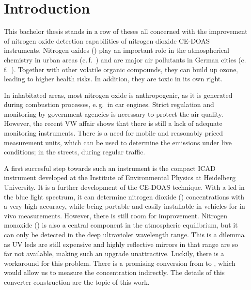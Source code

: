 \section{Introduction}
\label{sec:intro}

This bachelor thesis stands in a row of theses all concerned with the
improvement of nitrogen oxide detection capabilities of nitrogen
dioxide CE-DOAS instruments. Nitrogen oxides () play an
important role in the atmospherical chemistry in urban areas
(c.\,f.~\cite{roedel}) and are major air pollutants in German cities
(c.\,f.~\cite{no2schadstoff,who}). Together with other volatile
organic compounds, they can build up ozone, leading to higher health
risks. In addition, they are toxic in its own right.

In inhabitated areas, most nitrogen oxide is anthropogenic, as it is
generated during combustion processes, e.\,g.\ in car engines. Strict
regulation and monitoring by government agencies is necessary to
protect the air quality. However, the recent VW affair shows that
there is still a lack of adequate monitoring instruments. There is a
need for mobile and reasonably priced measurement units, which can be
used to determine the  emissions under live conditions; in
the streets, during regular traffic.

A first succesful step towards such an instrument is the compact ICAD
instrument developed at the Institute of Environmental Physics at
Heidelberg University. It is a further development of the CE-DOAS
technique. With a led in the blue light spectrum, it can determine
nitrogen dioxide () concentrations with a very high accuracy,
while being portable and easily installable in vehicles for in vivo
measurements. However, there is still room for improvement. Nitrogen
monoxide () is also a central component in the atmospheric
 equilibrium, but it can only be detected in the deep
ultraviolet wavelength range. This is a dilemma as UV leds are still
expensive and highly reflective mirrors in that range are so far not
available, making such an upgrade unattractive. Luckily, there is a
workaround for this problem. There is a promising conversion from
 to , which would allow us to measure the concentration
indirectly. The details of this converter construction are the topic
of this work.

